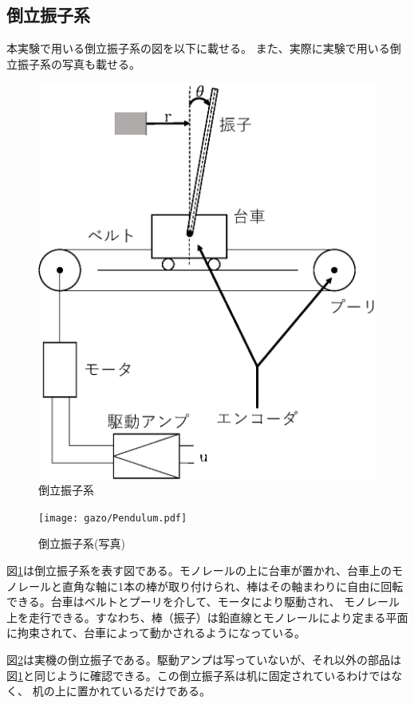 \subsection{倒立振子系}
本実験で用いる倒立振子系の図を以下に載せる。
また、実際に実験で用いる倒立振子系の写真も載せる。
\begin{figure}[H]
	\centering
	\includegraphics[width=0.8\linewidth]{gazo/pendulum.eps}
	\caption{倒立振子系}
	\label{image:pendulum}
\end{figure}
\begin{figure}[H]
	\centering
	\texttt{[image: gazo/Pendulum.pdf]}
	\caption{倒立振子系(写真)}
	\label{image:pendulum_photo}
\end{figure}
図\ref{image:pendulum}は倒立振子系を表す図である。モノレールの上に台車が置かれ、台車上のモノレールと直角な軸に1本の棒が取り付けられ、棒はその軸まわりに自由に回転できる。台車はベルトとプーリを介して、モータにより駆動され、
モノレール上を走行できる。すなわち、棒（振子）は鉛直線とモノレールにより定まる平面に拘束されて、台車によって動かされるようになっている。\cite{Koga:Binpe}
\par
図\ref{image:pendulum_photo}は実機の倒立振子である。駆動アンプは写っていないが、それ以外の部品は図\ref{image:pendulum}と同じように確認できる。この倒立振子系は机に固定されているわけではなく、
机の上に置かれているだけである。
